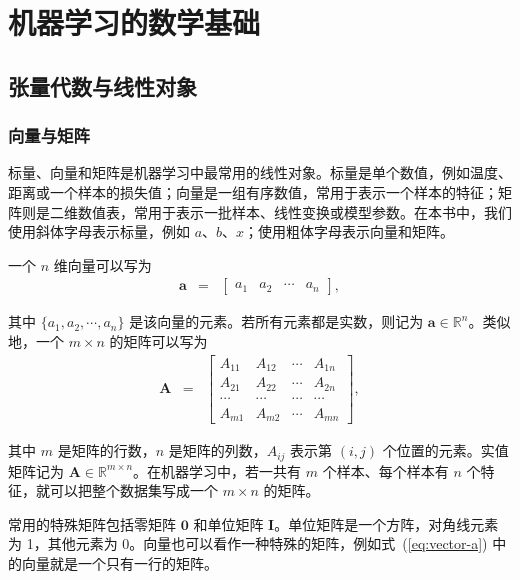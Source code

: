 \section{机器学习的数学基础}


\subsection{张量代数与线性对象}

\subsubsection{向量与矩阵}

\noindent 标量、向量和矩阵是机器学习中最常用的线性对象。标量是单个数值，例如温度、距离或一个样本的损失值；向量是一组有序数值，常用于表示一个样本的特征；矩阵则是二维数值表，常用于表示一批样本、线性变换或模型参数。在本书中，我们使用斜体字母表示标量，例如 $a$、$b$、$x$；使用粗体字母表示向量和矩阵。

一个 $n$ 维向量可以写为
\begin{eqnarray}
\mathbf{a} & = & \begin{bmatrix} a_1 & a_2 & \cdots & a_n \end{bmatrix}, \label{eq:vector-a}
\end{eqnarray}

\noindent 其中 $\{a_1, a_2,\cdots, a_n\}$ 是该向量的元素。若所有元素都是实数，则记为 $\mathbf{a} \in \mathbb{R}^n$。类似地，一个 $m \times n$ 的矩阵可以写为
\begin{eqnarray}
\mathbf{A} & = &
\begin{bmatrix}
A_{11} & A_{12} & \cdots & A_{1n} \\
A_{21} & A_{22} & \cdots & A_{2n} \\
\cdots & \cdots & \cdots & \cdots \\
A_{m1} & A_{m2} & \cdots & A_{mn}
\end{bmatrix},
\end{eqnarray}

\noindent 其中 $m$ 是矩阵的行数，$n$ 是矩阵的列数，$A_{ij}$ 表示第 $(i,j)$ 个位置的元素。实值矩阵记为 $\mathbf{A} \in \mathbb{R}^{m \times n}$。在机器学习中，若一共有 $m$ 个样本、每个样本有 $n$ 个特征，就可以把整个数据集写成一个 $m\times n$ 的矩阵。


常用的特殊矩阵包括零矩阵 $\mathbf{0}$ 和单位矩阵 $\mathbf{I}$。单位矩阵是一个方阵，对角线元素为 1，其他元素为 0。向量也可以看作一种特殊的矩阵，例如式~(\ref{eq:vector-a}) 中的向量就是一个只有一行的矩阵。

